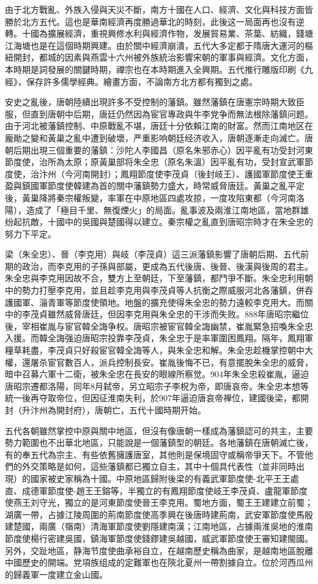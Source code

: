由于北方戰亂、外族入侵與天災不斷，南方十國在人口、經濟、文化與科技方面皆勝於北方五代。這也是華南經濟再度勝過華北的時刻，此後这一局面再也沒有逆轉。十國為擴展經濟，重視興修水利與經濟作物，发展貿易業、茶葉、紡織，錢塘江海塘也是在這個時期興建。由於關中經濟崩潰，五代大多定都于隋唐大運河的樞紐開封，都城的因素與燕雲十六州被外族統治影響宋朝的軍事與經濟。文化方面，本時期是詞發展的關鍵時期，禪宗也在本時期進入全興期。五代推行雕版印刷《九經》，保存許多儒學經典。繪畫方面，不論南方北方都有獨到之處。

安史之亂後，唐朝陸續出現許多不受控制的藩鎮。雖然藩鎮在唐憲宗時期大致臣服，但直到唐朝中后期，唐廷仍然因為宦官專政與牛李党争而無法根除藩鎮问题。由于河北被藩鎮控制、中原戰亂不堪，唐廷十分依賴江南的財富。然而江南地区在龐勛之變和黃巢之亂中遭到破壞，严重影响朝廷经济收入，唐朝逐漸走向滅亡。唐朝后期出現三個重要的藩鎮：沙陀人李國昌（原名朱邪赤心）因平亂有功受封河東節度使，治所為太原；原黃巢部将朱全忠（原名朱溫）因平亂有功，受封宣武軍節度使，治汴州（今河南開封）；鳳翔節度使李茂貞（後封岐王）、護國軍節度使王重盈與鎮國軍節度使韓建為首的關中藩鎮勢力盛大，時常威脅唐廷。黃巢之亂平定後，黃巢降將秦宗權叛變，率軍在中原地區四處攻掠，一度攻陷東都（今河南洛陽），造成了「極目千里、無復煙火」的局面。亂事波及兩淮江南地區，當地群雄纷起抗敵，十國中的吳國與楚國得以建立。秦宗權之亂直到唐昭宗時才在朱全忠的努力下平定。

梁（朱全忠）、晉（李克用）與岐（李茂貞）這三派藩鎮影響了唐朝后期、五代前期的政治，而李克用的子孫與部屬，更成為五代後唐、後晉、後漢與後周的君主。朱全忠與李克用因故不合，雙方上至朝廷，下至藩鎮，都鬥爭不斷。朱全忠利用朝中的勢力打壓李克用，並且趁李克用與李茂貞等人抗衡之際威服河北各藩鎮，併吞護國軍、淄青軍等節度使領地。地盤的擴充使得朱全忠的勢力遠較李克用大。而關中的李茂貞雖然威脅唐廷，但因李克用與朱全忠的干涉而失败。888年唐昭宗繼位後，宰相崔胤与宦官韓全誨争权。唐昭宗被宦官韓全誨幽禁，崔胤緊急招喚朱全忠入援。而韓全誨强迫唐昭宗投靠李茂貞，朱全忠于是率軍圍困鳳翔。隔年，鳳翔軍糧草耗盡，李茂貞只好殺宦官韓全誨等人，與朱全忠和解。朱全忠趁機掌控朝中大權，還屠杀宦官數百人，派兵控制長安。崔胤後悔不已，有意擺脫朱全忠的威脅，暗中召募六軍十二衛，被朱全忠在長安的眼線所察觉。904年朱全忠殺崔胤，逼迫唐昭宗遷都洛陽，同年8月弑帝，另立昭宗子李柷为帝，即唐哀帝。朱全忠本想等統一後再夺取帝位，但因征淮南失利，於907年逼迫唐哀帝禅位，建國後梁，都開封（升汴州為開封府），唐朝亡，五代十國時期开始。

五代各朝雖然掌控中原與關中地區，但沒有像唐朝一樣成為藩鎮認可的共主，主要勢力範圍也不出華北地區，只能說是一個藩鎮型的朝廷。各地藩鎮在唐朝滅亡後，有的奉五代為宗主、有些依舊擁護唐室，其他則是保境固守或稱帝爭天下。不管他們的外交策略是如何，這些藩鎮都已獨立自主，其中十個具代表性（並非同時出現）的國家被史家稱為十國。中原地區歸附後梁的有義武軍節度使-北平王王處直、成德軍節度使-趙王王鎔等，半獨立的有鳳翔節度使岐王李茂貞、盧龍軍節度使燕王刘守光，獨立的是河東節度使晉王李克用。蜀地方面，蜀王王建建立前蜀；湖廣一帶，占據江陵周圍的荊南節度使高季興在後唐時建荊南，武安軍節度使馬殷建楚國，兩廣（嶺南）清海軍節度使劉隱建南漢；江南地區，占據兩淮吳地的淮南節度使楊行密建吳國，鎮海軍節度使錢鏐建吳越國，威武軍節度使王審知建閩國。另外，交趾地區，静海节度使曲承裕自立，在越南歷史稱為曲家，是越南地區脫離中國歷史的開端。党項族组成的定難軍也在陝北夏州一帶割據自立。位於河西瓜州的歸義軍一度建立金山國。

